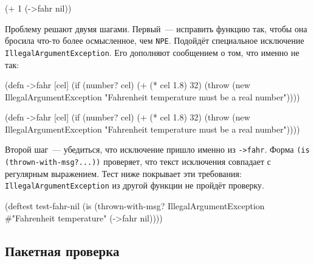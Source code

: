 \begin{english}
  \begin{clojure}
(+ 1 (->fahr nil))
  \end{clojure}
\end{english}

\label{illegal-arg}

Проблему решают двумя шагами. Первый~--- исправить функцию так, чтобы она
бросила что-то более осмысленное, чем \verb|NPE|. Подойдёт специальное
исключение \texttt{IllegalArgumentException}. Его дополняют сообщением о том,
что именно не так:

\ifnarrow

\begin{english}
  \begin{clojure}
(defn ->fahr [cel]
  (if (number? cel)
    (+ (* cel 1.8) 32)
    (throw (new IllegalArgumentException
             "Fahrenheit temperature
              must be a real number"))))
  \end{clojure}
\end{english}

\else

\begin{english}
  \begin{clojure}
(defn ->fahr [cel]
  (if (number? cel)
    (+ (* cel 1.8) 32)
    (throw (new IllegalArgumentException
            "Fahrenheit temperature must be
                                  a real number"))))
  \end{clojure}
\end{english}

\fi

Второй шаг~--- убедиться, что исключение пришло именно из \verb|->fahr|. Форма
\texttt{(is (thrown\--with-msg?...))} проверяет, что текст исключения совпадает
с регулярным выражением. Тест ниже покрывает эти требования:
\texttt{IllegalArgumentException} из другой функции не пройдёт проверку.

\begin{english}
  \begin{clojure}
(deftest test-fahr-nil
  (is (thrown-with-msg?
       IllegalArgumentException
       #"Fahrenheit temperature"
       (->fahr nil))))
  \end{clojure}
\end{english}

\subsection{Пакетная проверка}

